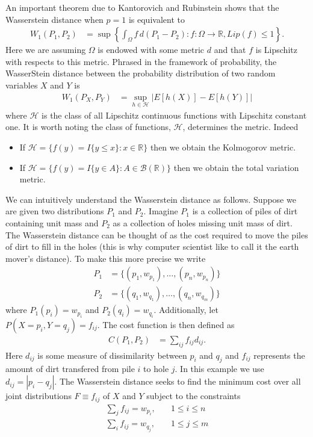 \documentclass[11pt]{article}
\begin{document}
\begin{flushleft}
An important theorem due to Kantorovich and Rubinstein shows that the Wasserstein distance when $p=1$ is equivalent to
\begin{align*}
  W_1(P_1,P_2) &= \sup \left\{ \int_{\Omega} f \, d(P_1-P_2) : f: \Omega \to \mathbb{R}, Lip(f) \leq 1  \right\}.
  \end{align*}
Here we are assuming $\Omega$ is endowed with some metric $d$ and that $f$ is Lipschitz with respects to this metric. Phrased in the framework of probability, the WasserStein distance
between the probability distribution of two random variables
$X$ and $Y$ is 
\begin{align*}
  W_1(P_X,P_Y) &= \sup_{h \in \mathcal{H}} | E[h(X)] - E[h(Y)] |
  \end{align*}
where $\mathcal{H}$ is the class of all Lipschitz continuous functions with Lipschitz constant one. It is worth 
noting the class of functions, $\mathcal{H}$, determines the metric. Indeed
\begin{itemize}
\item
If $\mathcal{H} = \{f(y) = I\{y \leq x\}: x \in \mathbb{R}\}$ then we obtain the Kolmogorov metric.
\item
If $\mathcal{H} = \{f(y) = I\{y \in A\}: A \in \mathcal{B}(\mathbb{R})\}$ then we obtain the total variation metric.
\end{itemize} 

\medskip

We can intuitively understand the Wasserstein distance as follows.
Suppose we are given two distributions $P_1$ and $P_2$. Imagine $P_1$ is a collection of piles of dirt containing unit mass and $P_2$ as a collection of holes missing unit mass of dirt. The Wasserstein distance can be thought of as the cost required to move the piles of dirt to fill in the holes (this is why computer scientist like to call it the earth mover's distance). To make this more precise we write 
\begin{align*}
P_1 &= \{(p_1,w_{p_1}), \ldots, (p_n, w_{p_n})\}\\
P_2 &= \{(q_1,w_{q_1}), \ldots, (q_n, w_{q_m})\}
\end{align*}
where $P_1(p_i) = w_{p_i}$ and $P_2(q_i) = w_{q_i}$. Additionally, let $P(X = p_i, Y = q_j)  = f_{ij}$. The cost function is then defined as
\begin{align*}
  C(P_1,P_2) &= \sum_{ij} f_{ij} d_{ij}.
\end{align*}
Here $d_{ij}$ is some measure of dissimilarity between $p_i$ and $q_j$ and $f_{ij}$ represents the amount of dirt transfered from pile $i$ to hole $j$. In this example we use $d_{ij} = |p_i  - q_j|$. The Wasserstein distance seeks to find the minimum cost over all joint distributions $F \equiv f_{ij}$ of $X$ and $Y$ subject to the constraints
\begin{align*}
  \sum_{j} f_{ij} = w_{p_i}, &\quad 1 \leq i \leq n \tag{1}\\
  \sum_{i} f_{ij} = w_{q_j}, &\quad 1 \leq j \leq m \tag{2}
  \end{align*}


\end{flushleft}
\end{document}
